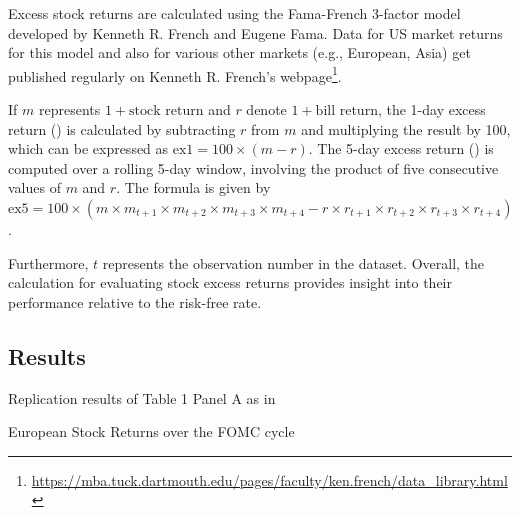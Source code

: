 Excess stock returns are calculated using the Fama-French 3-factor model developed by Kenneth R. French and Eugene Fama.  
Data for US market returns for this model and also for various other markets (e.g., European, Asia) get published regularly on Kenneth R. French's webpage\footnote{\url{https://mba.tuck.dartmouth.edu/pages/faculty/ken.french/data_library.html}}.

If \(m\) represents \(1 + \text{{stock return}}\) and \(r\) denote \(1 + \text{{bill return}}\), the 1-day excess return () is calculated by subtracting \(r\) from \(m\) and multiplying the result by 100, which can be expressed as \(\text{{ex1}} = 100 \times (m - r)\). The 5-day excess return () is computed over a rolling 5-day window, involving the product of five consecutive values of \(m\) and \(r\). The formula is given by \(\text{{ex5}} = 100 \times (m \times m_{t+1} \times m_{t+2} \times m_{t+3} \times m_{t+4} - r \times r_{t+1} \times r_{t+2} \times r_{t+3} \times r_{t+4})\).

Furthermore, \(t\) represents the observation number in the dataset. 
Overall, the calculation for evaluating stock excess returns provides insight into their 
performance relative to the risk-free rate.

\subsection{Results}

\begin{table}[h]
\begin{center}
\begin{adjustbox}{width=1\textwidth}

\end{tabular}
}
\end{adjustbox}
\caption{\label{table_1} Replication results of Table 1 Panel A as in \parencite{cieslak_stock_2019}}
\end{center}
\end{table}


\begin{table}[h]
\begin{center}
\begin{adjustbox}{width=1\textwidth}

\end{tabular}
}
\end{adjustbox}
\caption{\label{table_2} European Stock Returns over the FOMC cycle}
\end{center}
\end{table}


